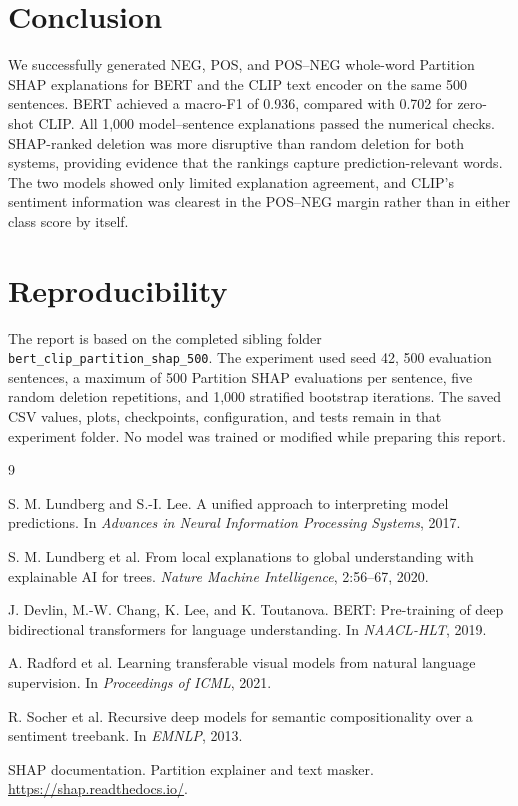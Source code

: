 \documentclass[11pt,a4paper]{article}
\begin{document}
\section{Conclusion}

We successfully generated NEG, POS, and POS--NEG whole-word Partition SHAP explanations for BERT and the CLIP text encoder on the same 500 sentences. BERT achieved a macro-F1 of 0.936, compared with 0.702 for zero-shot CLIP. All 1,000 model--sentence explanations passed the numerical checks. SHAP-ranked deletion was more disruptive than random deletion for both systems, providing evidence that the rankings capture prediction-relevant words. The two models showed only limited explanation agreement, and CLIP's sentiment information was clearest in the POS--NEG margin rather than in either class score by itself.

\section*{Reproducibility}

The report is based on the completed sibling folder \texttt{bert\_clip\_partition\_shap\_500}. The experiment used seed 42, 500 evaluation sentences, a maximum of 500 Partition SHAP evaluations per sentence, five random deletion repetitions, and 1,000 stratified bootstrap iterations. The saved CSV values, plots, checkpoints, configuration, and tests remain in that experiment folder. No model was trained or modified while preparing this report.

\begin{thebibliography}{9}

S. M. Lundberg and S.-I. Lee.
\newblock A unified approach to interpreting model predictions.
\newblock In \emph{Advances in Neural Information Processing Systems}, 2017.

S. M. Lundberg et al.
\newblock From local explanations to global understanding with explainable AI for trees.
\newblock \emph{Nature Machine Intelligence}, 2:56--67, 2020.

J. Devlin, M.-W. Chang, K. Lee, and K. Toutanova.
\newblock BERT: Pre-training of deep bidirectional transformers for language understanding.
\newblock In \emph{NAACL-HLT}, 2019.

A. Radford et al.
\newblock Learning transferable visual models from natural language supervision.
\newblock In \emph{Proceedings of ICML}, 2021.

R. Socher et al.
\newblock Recursive deep models for semantic compositionality over a sentiment treebank.
\newblock In \emph{EMNLP}, 2013.

SHAP documentation.
\newblock Partition explainer and text masker.
\newblock \url{https://shap.readthedocs.io/}.

\end{thebibliography}
\end{document}

